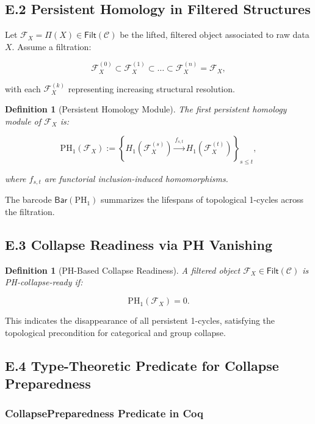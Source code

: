 \documentclass[11pt]{article}
\newtheorem{definition}[theorem]{Definition}
\begin{document}
\subsection*{E.2 Persistent Homology in Filtered Structures}

Let \( \mathcal{F}_X = \Pi(X) \in \mathsf{Filt}(\mathcal{C}) \) be the lifted, filtered object associated to raw data \( X \). Assume a filtration:

\[
\mathcal{F}_X^{(0)} \subset \mathcal{F}_X^{(1)} \subset \ldots \subset \mathcal{F}_X^{(n)} = \mathcal{F}_X,
\]

with each \( \mathcal{F}_X^{(k)} \) representing increasing structural resolution.

\begin{definition}[Persistent Homology Module]
The first persistent homology module of \( \mathcal{F}_X \) is:

\[
\mathrm{PH}_1(\mathcal{F}_X) := \left\{ H_1\left(\mathcal{F}_X^{(s)}\right) \xrightarrow{f_{s,t}} H_1\left(\mathcal{F}_X^{(t)}\right) \right\}_{s \leq t},
\]

where \( f_{s,t} \) are functorial inclusion-induced homomorphisms.
\end{definition}

The barcode \( \mathsf{Bar}(\mathrm{PH}_1) \) summarizes the lifespans of topological 1-cycles across the filtration.

\subsection*{E.3 Collapse Readiness via PH Vanishing}

\begin{definition}[PH-Based Collapse Readiness]
A filtered object \( \mathcal{F}_X \in \mathsf{Filt}(\mathcal{C}) \) is \emph{PH-collapse-ready} if:

\[
\mathrm{PH}_1(\mathcal{F}_X) = 0.
\]
\end{definition}

This indicates the disappearance of all persistent 1-cycles, satisfying the topological precondition for categorical and group collapse.

\subsection*{E.4 Type-Theoretic Predicate for Collapse Preparedness}

\subsubsection*{CollapsePreparedness Predicate in Coq}
\end{document}
